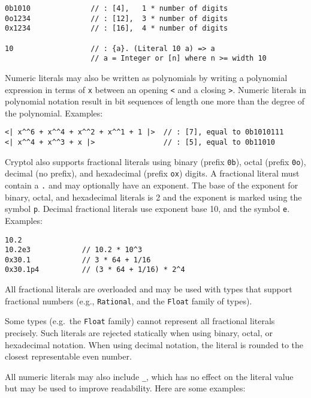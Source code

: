 \begin{verbatim}
0b1010              // : [4],   1 * number of digits
0o1234              // : [12],  3 * number of digits
0x1234              // : [16],  4 * number of digits

10                  // : {a}. (Literal 10 a) => a
                    // a = Integer or [n] where n >= width 10
\end{verbatim}

Numeric literals may also be written as polynomials by writing a
polynomial expression in terms of \texttt{x} between an opening
\texttt{\textless{}\textbar{}} and a closing
\texttt{\textbar{}\textgreater{}}. Numeric literals in polynomial
notation result in bit sequences of length one more than the degree of
the polynomial. Examples:

\begin{verbatim}
<| x^^6 + x^^4 + x^^2 + x^^1 + 1 |>  // : [7], equal to 0b1010111
<| x^^4 + x^^3 + x |>                // : [5], equal to 0b11010
\end{verbatim}

Cryptol also supports fractional literals using binary (prefix
\texttt{0b}), octal (prefix \texttt{0o}), decimal (no prefix), and
hexadecimal (prefix \texttt{ox}) digits. A fractional literal must
contain a \texttt{.} and may optionally have an exponent. The base of
the exponent for binary, octal, and hexadecimal literals is 2 and the
exponent is marked using the symbol \texttt{p}. Decimal fractional
literals use exponent base 10, and the symbol \texttt{e}. Examples:

\begin{verbatim}
10.2
10.2e3            // 10.2 * 10^3
0x30.1            // 3 * 64 + 1/16
0x30.1p4          // (3 * 64 + 1/16) * 2^4
\end{verbatim}

All fractional literals are overloaded and may be used with types that
support fractional numbers (e.g., \texttt{Rational}, and the
\texttt{Float} family of types).

Some types (e.g.~the \texttt{Float} family) cannot represent all
fractional literals precisely. Such literals are rejected statically
when using binary, octal, or hexadecimal notation. When using decimal
notation, the literal is rounded to the closest representable even
number.

All numeric literals may also include \texttt{\_}, which has no effect
on the literal value but may be used to improve readability. Here are
some examples:

